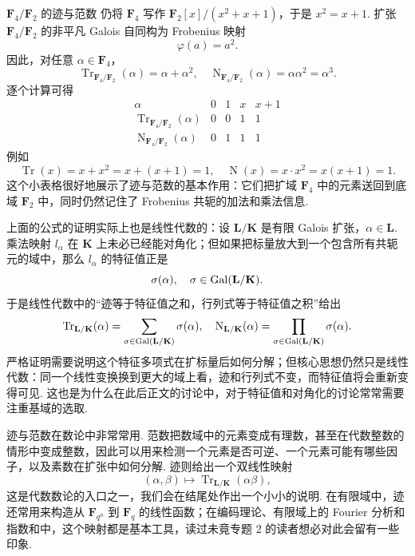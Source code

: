 \begin{example}{$\mathbf{F}_4/\mathbf{F}_2$ 的迹与范数}{}
    仍将 $\mathbf{F}_4$ 写作 $\mathbf{F}_2[x]/(x^2+x+1)$，于是 $x^2=x+1$. 扩张 $\mathbf{F}_4/\mathbf{F}_2$ 的非平凡 Galois 自同构为 Frobenius 映射
    \[
        \varphi(a)=a^2.
    \]
    因此，对任意 $\alpha\in\mathbf{F}_4$，
    \[
        \operatorname{Tr}_{\mathbf{F}_4/\mathbf{F}_2}(\alpha)=\alpha+\alpha^2,\quad
        \operatorname{N}_{\mathbf{F}_4/\mathbf{F}_2}(\alpha)=\alpha\alpha^2=\alpha^3.
    \]
    逐个计算可得
    \[
    \begin{array}{c|cccc}
        \alpha & 0 & 1 & x & x+1 \\
        \hline
        \operatorname{Tr}_{\mathbf{F}_4/\mathbf{F}_2}(\alpha) & 0 & 0 & 1 & 1 \\
        \operatorname{N}_{\mathbf{F}_4/\mathbf{F}_2}(\alpha) & 0 & 1 & 1 & 1
    \end{array}
    \]
    例如
    \[
        \operatorname{Tr}(x)=x+x^2=x+(x+1)=1,\quad
        \operatorname{N}(x)=x\cdot x^2=x(x+1)=1.
    \]
    这个小表格很好地展示了迹与范数的基本作用：它们把扩域 $\mathbf{F}_4$ 中的元素送回到底域 $\mathbf{F}_2$ 中，同时仍然记住了 Frobenius 共轭的加法和乘法信息.
\end{example}

上面的公式的证明实际上也是线性代数的：设 $\mathbf{L}/\mathbf{K}$ 是有限 Galois 扩张，$\alpha\in\mathbf{L}$. 乘法映射 $l_\alpha$ 在 $\mathbf{K}$ 上未必已经能对角化；但如果把标量放大到一个包含所有共轭元的域中，那么 $l_\alpha$ 的特征值正是
\[
    \sigma(\alpha),\quad \sigma\in\operatorname{Gal}(\mathbf{L}/\mathbf{K}).
\]
于是线性代数中的``迹等于特征值之和，行列式等于特征值之积''给出
\[
    \operatorname{Tr}_{\mathbf{L}/\mathbf{K}}(\alpha)
    =\sum_{\sigma\in\operatorname{Gal}(\mathbf{L}/\mathbf{K})}\sigma(\alpha),
    \quad
    \operatorname{N}_{\mathbf{L}/\mathbf{K}}(\alpha)
    =\prod_{\sigma\in\operatorname{Gal}(\mathbf{L}/\mathbf{K})}\sigma(\alpha).
\]
严格证明需要说明这个特征多项式在扩标量后如何分解；但核心思想仍然只是线性代数：同一个线性变换换到更大的域上看，迹和行列式不变，而特征值将会重新变得可见. 这也是为什么在此后正文的讨论中，对于特征值和对角化的讨论常常需要注重基域的选取.

迹与范数在数论中非常常用. 范数把数域中的元素变成有理数，甚至在代数整数的情形中变成整数，因此可以用来检测一个元素是否可逆、一个元素可能有哪些因子，以及素数在扩张中如何分解. 迹则给出一个双线性映射
\[
    (\alpha,\beta)\longmapsto \operatorname{Tr}_{\mathbf{L}/\mathbf{K}}(\alpha\beta),
\]
这是代数数论的入口之一，我们会在结尾处作出一个小小的说明. 在有限域中，迹还常用来构造从 $\mathbf{F}_{q^n}$ 到 $\mathbf{F}_q$ 的线性函数；在编码理论、有限域上的 Fourier 分析和指数和中，这个映射都是基本工具，读过未竟专题 2 的读者想必对此会留有一些印象.

